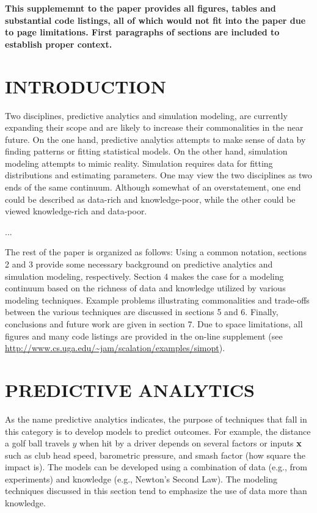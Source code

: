 \documentclass{wscpaperproc}
\theoremstyle{wsc}
\begin{document}
{\bf This supplememnt to the paper provides all figures, tables and substantial code listings, 
all of which would not fit into the paper due to page limitations.
First paragraphs of sections are included to establish proper context.}

\section{INTRODUCTION}

Two disciplines, predictive analytics and simulation modeling, are currently expanding their scope and
are likely to increase their commonalities in the near future.
On the one hand, predictive analytics attempts to make sense of data by finding patterns or fitting
statistical models.
On the other hand, simulation modeling attempts to mimic reality.
Simulation requires data for fitting distributions and estimating parameters.
One may view the two disciplines as two ends of the same continuum.
Although somewhat of an overstatement, one end could be described as data-rich and knowledge-poor,
while the other could be viewed knowledge-rich and data-poor.

...

The rest of the paper is organized as follows:
Using a common notation, sections 2 and 3 provide some necessary background on
predictive analytics and simulation modeling, respectively.
Section 4 makes the case for a modeling continuum based on
the richness of data and knowledge utilized by various
modeling techniques.
Example problems illustrating commonalities and trade-offs
between the various techniques are discussed in sections 5 and 6.
Finally, conclusions and future work are given in section 7.
Due to space limitations, all figures and many code listings
are provided in the on-line supplement
(see \url{http://www.cs.uga.edu/~jam/scalation/examples/simopt}).

\section{PREDICTIVE ANALYTICS}

As the name predictive analytics indicates, the purpose of techniques
that fall in this category is to develop models to predict outcomes.
For example, the distance a golf ball travels $y$ when hit by a driver
depends on several factors or inputs ${\bf x}$ such as club head speed,
barometric pressure, and smash factor (how square the impact is).
The models can be developed using a combination of data (e.g.,
from experiments) and knowledge (e.g., Newton's Second Law).
The modeling techniques discussed in this section tend to emphasize
the use of data more than knowledge.
\end{document}
